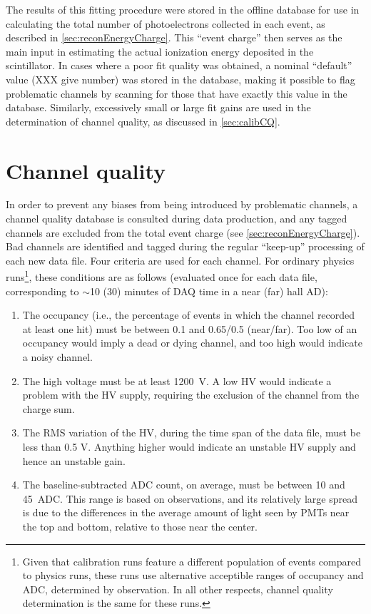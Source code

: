 \documentclass[../thesis.tex]{subfiles}
\begin{document}
The results of this fitting procedure were stored in the offline database for use in calculating the total number of photoelectrons collected in each event, as described in \autoref{sec:reconEnergyCharge}. This ``event charge'' then serves as the main input in estimating the actual ionization energy deposited in the scintillator. In cases where a poor fit quality was obtained, a nominal ``default'' value (XXX give number) was stored in the database, making it possible to flag problematic channels by scanning for those that have exactly this value in the database. Similarly, excessively small or large fit gains are used in the determination of channel quality, as discussed in \autoref{sec:calibCQ}.

\section{Channel quality}
\label{sec:calibCQ}

In order to prevent any biases from being introduced by problematic channels, a channel quality database is consulted during data production, and any tagged channels are excluded from the total event charge (see \autoref{sec:reconEnergyCharge}). Bad channels are identified and tagged during the regular ``keep-up'' processing of each new data file. Four criteria are used for each channel. For ordinary physics runs\footnote{Given that calibration runs feature a different population of events compared to physics runs, these runs use alternative acceptible ranges of occupancy and ADC, determined by observation. In all other respects, channel quality determination is the same for these runs.}, these conditions are as follows (evaluated once for each data file, corresponding to $\sim$10 (30) minutes of DAQ time in a near (far) hall AD):

\begin{enumerate}
\item The occupancy (i.e., the percentage of events in which the channel recorded at least one hit) must be between 0.1 and 0.65/0.5 (near/far). Too low of an occupancy would imply a dead or dying channel, and too high would indicate a noisy channel.
\item The high voltage must be at least 1200~V. A low HV would indicate a problem with the HV supply, requiring the exclusion of the channel from the charge sum.
\item The RMS variation of the HV, during the time span of the data file, must be less than 0.5 V. Anything higher would indicate an unstable HV supply and hence an unstable gain.
\item The baseline-subtracted ADC count, on average, must be between 10 and 45~ADC. This range is based on observations, and its relatively large spread is due to the differences in the average amount of light seen by PMTs near the top and bottom, relative to those near the center.
\end{enumerate}
\end{document}
